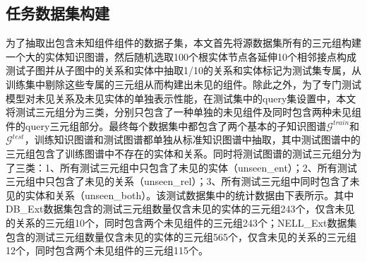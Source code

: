 \subsection{任务数据集构建}
为了抽取出包含未知组件组件的数据子集，本文首先将源数据集所有的三元组构建一个大的实体知识图谱，然后随机选取100个根实体节点各延伸10个相邻接点构成测试子图并从子图中的关系和实体中抽取1/10的关系和实体标记为测试集专属，从训练集中剔除这些专属的三元组从而构建出未见的组件。除此之外，为了专门测试模型对未见关系及未见实体的单独表示性能，在测试集中的query集设置中，本文将测试三元组分为三类，分别只包含了一种单独的未见组件及同时包含两种未见组件的query三元组部分。最终每个数据集中都包含了两个基本的子知识图谱\(\mathcal{G}^{train}\)和\(\mathcal{G}^{test}\)，训练知识图谱和测试图谱都单独从标准知识图谱中抽取，其中测试图谱中的三元组包含了训练图谱中不存在的实体和关系。同时将测试图谱的测试三元组分为了三类：1、所有测试三元组中只包含了未见的实体（unseen\_ent）；2、所有测试三元组中只包含了未见的关系（unseen\_rel）；3、所有测试三元组中同时包含了未见的实体和关系（unseen\_both）。该测试数据集中的统计数据由下表所示。其中DB\_Ext数据集包含的测试三元组数量仅含未见的实体的三元组243个，仅含未见的关系的三元组10个，同时包含两个未见组件的三元组243个；NELL\_Ext数据集包含的测试三元组数量仅含未见的实体的三元组565个，仅含未见的关系的三元组12个，同时包含两个未见组件的三元组115个。

